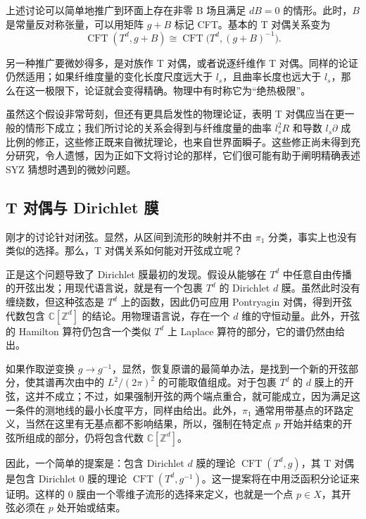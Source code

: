 上述讨论可以简单地推广到环面上存在非零 B 场且满足 $dB=0$ 的情形。此时，$B$ 是常量反对称张量，可以用矩阵 $g+B$ 标记 CFT。基本的 T 对偶关系变为
\[
\operatorname{CFT}(T^d,g+B)\cong\operatorname{CFT}\bigl(T^d,(g+B)^{-1}\bigr).
\]

另一种推广要微妙得多，是对族作 T 对偶，或者说逐纤维作 T 对偶。同样的论证仍然适用；如果纤维度量的变化长度尺度远大于 $l_s$，且曲率长度也远大于 $l_s$，那么在这一极限下，论证就会变得精确。物理中有时称它为“绝热极限”。

虽然这个假设非常苛刻，但还有更具启发性的物理论证，表明 T 对偶应当在更一般的情形下成立；我们所讨论的关系会得到与纤维度量的曲率 $l_s^2R$ 和导数 $l_s\partial$ 成比例的修正，这些修正既来自微扰理论，也来自世界面瞬子。这些修正尚未得到充分研究，令人遗憾，因为正如下文将讨论的那样，它们很可能有助于阐明精确表述 SYZ 猜想时遇到的微妙问题。

\subsection{T 对偶与 Dirichlet 膜}\label{sec:1.3.1}

刚才的讨论针对闭弦。显然，从区间到流形的映射并不由 $\pi_1$ 分类，事实上也没有类似的选择。那么，T 对偶关系如何能对开弦成立呢？

正是这个问题导致了 Dirichlet 膜最初的发现。假设从能够在 $T^d$ 中任意自由传播的开弦出发；用现代语言说，就是有一个包裹 $T^d$ 的 Dirichlet $d$ 膜。虽然此时没有缠绕数，但这种弦态是 $T^d$ 上的函数，因此仍可应用 Pontryagin 对偶，得到开弦代数包含 $\mathbb{C}[\mathbb{Z}^d]$ 的结论。用物理语言说，存在一个 $d$ 维的守恒动量。此外，开弦的 Hamilton 算符仍包含一个类似 $T^d$ 上 Laplace 算符的部分，它的谱仍然由给出。

如果作取逆变换 $g\to g^{-1}$，显然，恢复原谱的最简单办法，是找到一个新的开弦部分，使其谱再次由中的 $L^2/(2\pi)^2$ 的可能取值组成。对于包裹 $T^d$ 的 $d$ 膜上的开弦，这并不成立；不过，如果强制开弦的两个端点重合，就可能成立，因为满足这一条件的测地线的最小长度平方，同样由给出。此外，$\pi_1$ 通常用带基点的环路定义，当然在这里有无基点都不影响结果，所以，强制在特定点 $p$ 开始并结束的开弦所组成的部分，仍将包含代数 $\mathbb{C}[\mathbb{Z}^d]$。

因此，一个简单的提案是：包含 Dirichlet $d$ 膜的理论 $\operatorname{CFT}(T^d,g)$，其 T 对偶是包含 Dirichlet $0$ 膜的理论 $\operatorname{CFT}(T^d,g^{-1})$。这一提案将在中用泛函积分论证来证明。这样的 $0$ 膜由一个零维子流形的选择来定义，也就是一个点 $p\in X$，其开弦必须在 $p$ 处开始或结束。

